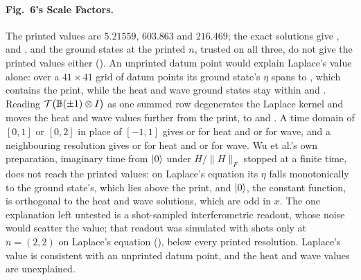 \paragraph{Fig.~6's Scale Factors.} The printed values are $5.21559$, $603.863$ and $216.469$; the exact solutions give ,  and , and the ground states at the printed $n$, trusted on all three, do not give the printed values either (). An unprinted datum point would explain Laplace's value alone: over a $41\times41$ grid of datum points its ground state's $\eta$ spans  to , which contains the print, while the heat and wave ground states stay within  and . Reading $\mathcal T\bigl(\mathbb{B}(\pm1)\otimes I\bigr)$ as one summed row degenerates the Laplace kernel and moves the heat and wave values further from the print, to  and . A time domain of $[0,1]$ or $[0,2]$ in place of $[-1,1]$ gives  or  for heat and  or  for wave, and a neighbouring resolution gives  or  for heat and  or  for wave. Wu et al.'s own preparation, imaginary time from $\ket0$ under $H/\|H\|_F$ stopped at a finite time, does not reach the printed values: on Laplace's equation its $\eta$ falls monotonically to the ground state's, which lies above the print, and $\ket0$, the constant function, is orthogonal to the heat and wave solutions, which are odd in $x$. The one explanation left untested is a shot-sampled interferometric readout, whose noise would scatter the value; that readout was simulated with shots only at $n=(2,2)$ on Laplace's equation (), below every printed resolution. Laplace's value is consistent with an unprinted datum point, and the heat and wave values are unexplained.

